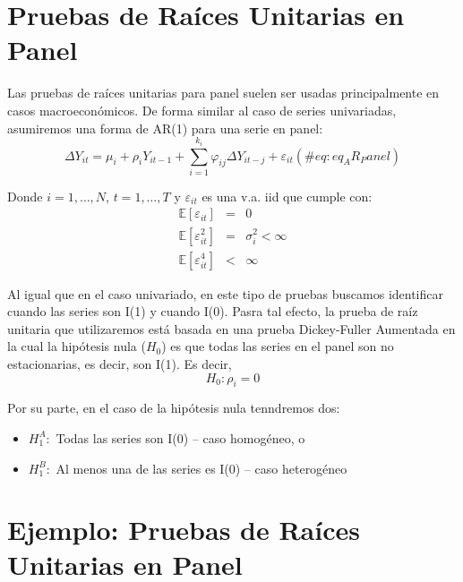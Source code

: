\documentclass[
]{book}
\begin{document}
\hypertarget{pruebas-de-rauxedces-unitarias-en-panel}{%
\section{Pruebas de Raíces Unitarias en Panel}\label{pruebas-de-rauxedces-unitarias-en-panel}}

Las pruebas de raíces unitarias para panel suelen ser usadas principalmente en casos macroeconómicos. De forma similar al caso de series univariadas, asumiremos una forma de AR(1) para una serie en panel:
\begin{equation}
    \Delta Y_{it} = \mu_i + \rho_i Y_{i t-1} + \sum_{i = 1}^{k_i} \varphi_{ij} \Delta Y_{i t-j} + \varepsilon_{it}
    (\#eq:eq_AR_Panel)
\end{equation}

Donde \(i = 1, \ldots, N\), \(t = 1, \ldots, T\) y \(\varepsilon_{it}\) es una v.a. iid que cumple con:
\begin{eqnarray*}
    \mathbb{E}[\varepsilon_{it}] & = & 0 \\
    \mathbb{E}[\varepsilon_{it}^2] & = & \sigma^2_i < \infty \\
    \mathbb{E}[\varepsilon_{it}^4] & < & \infty 
\end{eqnarray*}

Al igual que en el caso univariado, en este tipo de pruebas buscamos identificar cuando las series son I(1) y cuando I(0). Pasra tal efecto, la prueba de raíz unitaria que utilizaremos está basada en una prueba Dickey-Fuller Aumentada en la cual la hipótesis nula (\(H_0\)) es que todas las series en el panel son no estacionarias, es decir, son I(1). Es decir,
\begin{equation}
    H_0 : \rho_i = 0
\end{equation}

Por su parte, en el caso de la hipótesis nula tenndremos dos:

\begin{itemize}
    \item $H_1^A :$ Todas las series son I(0) -- caso homogéneo, o
    
    \item $H_1^B :$ Al menos una de las series es I(0) -- caso heterogéneo
\end{itemize}

\hypertarget{ejemplo-pruebas-de-rauxedces-unitarias-en-panel}{%
\section{Ejemplo: Pruebas de Raíces Unitarias en Panel}\label{ejemplo-pruebas-de-rauxedces-unitarias-en-panel}}
\end{document}
